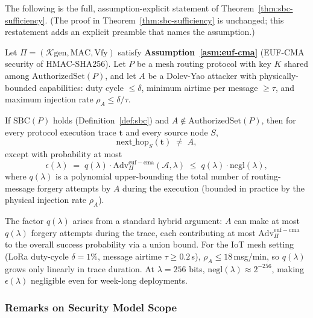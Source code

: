 The following is the full, assumption-explicit statement of
Theorem~\ref{thm:sbc-sufficiency}.  (The proof in
Theorem~\ref{thm:sbc-sufficiency} is unchanged; this restatement adds an
explicit preamble that names the assumption.)

\begin{theorem}
\label{thm:sbc-sufficiency-explicit}
Let $\Pi = (\mathcal{K}\text{gen}, \mathrm{MAC}, \mathrm{Vfy})$
satisfy \textbf{Assumption~\ref{asm:euf-cma}} (EUF-CMA security of
HMAC-SHA256).  Let $P$ be a mesh routing protocol with key $K$
shared among $\mathrm{AuthorizedSet}(P)$, and let $A$ be a Dolev-Yao
attacker with physically-bounded capabilities: duty cycle $\leq \delta$,
minimum airtime per message $\geq \tau$, and maximum injection rate
$\rho_A \leq \delta/\tau$.

If $\mathrm{SBC}(P)$ holds (Definition~\ref{def:sbc}) and
$A \notin \mathrm{AuthorizedSet}(P)$, then for every protocol execution
trace $\mathbf{t}$ and every source node $S$,
\[
  \mathrm{next\_hop}_{S}(\mathbf{t}) \;\neq\; A,
\]
except with probability at most
\[
  \epsilon(\lambda)
  \;=\;
  q(\lambda) \cdot \mathrm{Adv}^{\mathrm{euf-cma}}_\Pi(\mathcal{A}, \lambda)
  \;\leq\;
  q(\lambda) \cdot \mathrm{negl}(\lambda),
\]
where $q(\lambda)$ is a polynomial upper-bounding the total number of
routing-message forgery attempts by $A$ during the execution (bounded
in practice by the physical injection rate $\rho_A$).
\end{theorem}

\begin{remark}
\label{rem:reduction-tightness}
The factor $q(\lambda)$ arises from a standard hybrid argument: $A$ can
make at most $q(\lambda)$ forgery attempts during the trace, each
contributing at most $\mathrm{Adv}^{\mathrm{euf-cma}}_\Pi$ to the
overall success probability via a union bound.  For the IoT mesh
setting (LoRa duty-cycle $\delta = 1\%$, message airtime $\tau \geq 0.2$\,s),
$\rho_A \leq 18$\,msg/min, so $q(\lambda)$ grows only linearly in trace
duration.  At $\lambda = 256$ bits, $\mathrm{negl}(\lambda) \approx 2^{-256}$,
making $\epsilon(\lambda)$ negligible even for week-long deployments.
\end{remark}

\subsubsection*{Remarks on Security Model Scope}

